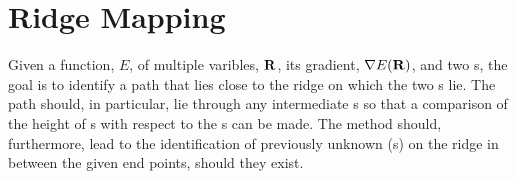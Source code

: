 
\section{Ridge Mapping}
\label{sec:ridge-mapping}

Given a function, $E$, of multiple varibles, ${\mathrm{\mathbf{\bm{R}}}}$, its gradient, $\nabla E({\mathrm{\mathbf{\bm{R}}}})$, and two s, the goal is to identify a path that lies close to the ridge on which the two s lie.
The path should, in particular, lie through any intermediate s so that a comparison of the height of s with respect to the s can be made.
The method should, furthermore, lead to the identification of previously unknown (s) on the ridge in between the given end points, should they exist.

